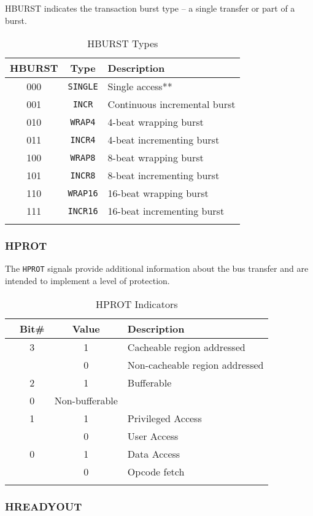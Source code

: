HBURST indicates the transaction burst type -- a single transfer or part
of a burst.

\begin{longtable}[c]{@{\extracolsep{\fill}}ccl}	
		\toprule 
		\textbf{HBURST} & \textbf{Type} & \textbf{Description}\\
		\midrule
		\endhead 
		000 & \texttt{SINGLE} & Single access**\\
		001 & \texttt{INCR} & Continuous incremental burst\\
		010 & \texttt{WRAP4} & 4-beat wrapping burst\\
		011 & \texttt{INCR4} & 4-beat incrementing burst\\
		100 & \texttt{WRAP8} & 8-beat wrapping burst\\
		101 & \texttt{INCR8} & 8-beat incrementing burst\\
		110 & \texttt{WRAP16} & 16-beat wrapping burst\\
		111 & \texttt{INCR16} & 16-beat incrementing burst\\
		\bottomrule 	
	\caption{HBURST Types}
	\label{tab:HBURST}
\end{longtable}

\subsubsection{HPROT}

The \texttt{HPROT} signals provide additional information about the bus
transfer and are intended to implement a level of protection.

\begin{longtable}[c]{@{}lccl}	
		\toprule 
		& \textbf{Bit\#} & \textbf{Value} & \textbf{Description}\\
		\midrule
		\endhead 
		& 3 & 1 & Cacheable region addressed\\
		& & 0 & Non-cacheable region addressed\\
		& 2 & 1 & Bufferable\\
		& 0 & Non-bufferable\\
		& 1 & 1 & Privileged Access\\
		& & 0 & User Access\\
		& 0 & 1 & Data Access\\
		& & 0 & Opcode fetch\\
		\bottomrule 	
	\caption{HPROT Indicators}
	\label{tab:HPROT}
\end{longtable}


\subsubsection{HREADYOUT}

